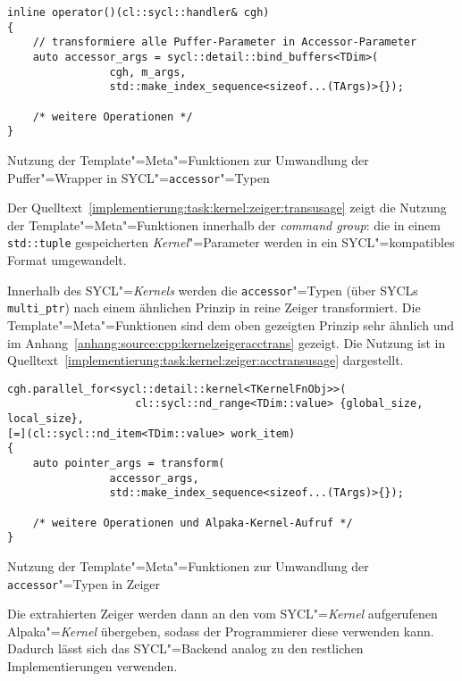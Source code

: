 \begin{code}
    \begin{verbatim}
inline operator()(cl::sycl::handler& cgh)
{
    // transformiere alle Puffer-Parameter in Accessor-Parameter
    auto accessor_args = sycl::detail::bind_buffers<TDim>(
                cgh, m_args,
                std::make_index_sequence<sizeof...(TArgs)>{});

    /* weitere Operationen */
}
    \end{verbatim}
    \caption{Nutzung der Template"=Meta"=Funktionen zur Umwandlung der
             Puffer"=Wrapper in SYCL"=\texttt{accessor}"=Typen}
    \label{implementierung:task:kernel:zeiger:transusage}
\end{code}

Der Quelltext~\ref{implementierung:task:kernel:zeiger:transusage} zeigt die
Nutzung der Template"=Meta"=Funktionen innerhalb der \textit{command group}:
die in einem \texttt{std::tuple} gespeicherten \textit{Kernel}"=Parameter werden in ein
SYCL"=kompatibles Format umgewandelt.

Innerhalb des SYCL"=\textit{Kernels} werden die \texttt{accessor}"=Typen (über SYCLs
\texttt{multi\_ptr}) nach einem ähnlichen Prinzip in reine Zeiger transformiert.
Die Template"=Meta"=Funktionen sind dem oben gezeigten Prinzip sehr ähnlich
und im Anhang~\ref{anhang:source:cpp:kernelzeigeracctrans} gezeigt. Die Nutzung
ist in Quelltext~\ref{implementierung:task:kernel:zeiger:acctransusage}
dargestellt.

\begin{code}
    \begin{verbatim}
cgh.parallel_for<sycl::detail::kernel<TKernelFnObj>>(
                    cl::sycl::nd_range<TDim::value> {global_size, local_size},
[=](cl::sycl::nd_item<TDim::value> work_item)
{
    auto pointer_args = transform(
                accessor_args,
                std::make_index_sequence<sizeof...(TArgs)>{});

    /* weitere Operationen und Alpaka-Kernel-Aufruf */
}
    \end{verbatim}
    \caption{Nutzung der Template"=Meta"=Funktionen zur Umwandlung der
             \texttt{accessor}"=Typen in Zeiger}
    \label{implementierung:task:kernel:zeiger:acctransusage}
\end{code}

Die extrahierten Zeiger werden dann an den vom SYCL"=\textit{Kernel} aufgerufenen
Alpaka"=\textit{Kernel} übergeben, sodass der Programmierer diese verwenden kann.
Dadurch lässt sich das SYCL"=Backend analog zu den restlichen Implementierungen
verwenden.

